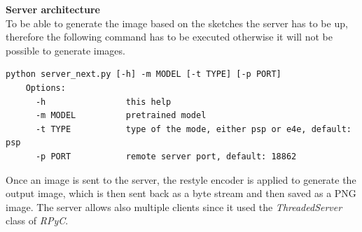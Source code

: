 %
\textbf{Server architecture}\\
To be able to generate the image based on the sketches the server has to be up, therefore the following command has to be executed otherwise it will not be possible to generate images.
\begin{lstlisting}[numbers=none]
    python server_next.py [-h] -m MODEL [-t TYPE] [-p PORT]
    Options:
      -h                this help
      -m MODEL          pretrained model
      -t TYPE           type of the mode, either psp or e4e, default: psp
      -p PORT           remote server port, default: 18862
\end{lstlisting}
Once an image is sent to the server, the restyle encoder is applied to generate the output image, which is then sent back as a byte stream and then saved as a PNG image. The server allows also multiple clients since it used the \textit{ThreadedServer} class of \textit{RPyC}.
